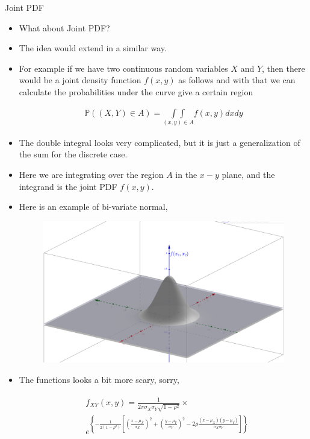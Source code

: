 \documentclass[8pt, usepdftitle=false]{beamer}
\begin{document}
\begin{frame}[allowframebreaks]{Joint PDF}
\begin{itemize}
	\item What about Joint PDF?

	\item The idea would extend in a similar way.

	\item For example if we have two continuous random variables $X$ and $Y$, then there would be a joint density function $f(x, y)$ as follows and with that we can calculate the probabilities under the curve give a certain region

	\begin{align*}
	\mathbb{P}((X, Y) \in A)={\int \int}\limits_{(x, y) \in A} f(x, y) d x d y
	\end{align*}

	\item The double integral looks very complicated, but it is just a generalization of the sum for the discrete case. 

	\item Here we are integrating over the region $A$ in the $x-y$ plane, and the integrand is the joint PDF $f(x, y)$. 

	\item Here is an example of bi-variate normal, 

	\begin{figure}
		\includegraphics[scale = .2]{Images/MVnorm.png}
	\end{figure}

	\item The functions looks a bit more scary, sorry,

	\begin{align*}
		\begin{aligned}
& f_{X Y}(x, y)=\frac{1}{2 \pi \sigma_X \sigma_Y \sqrt{1-\rho^2}} \times  \\
& e^{ \left\{-\frac{1}{2\left(1-\rho^2\right)}\left[\left(\frac{x-\mu_X}{\sigma_X}\right)^2+\left(\frac{y-\mu_Y}{\sigma_Y}\right)^2-2 \rho \frac{\left(x-\mu_X\right)\left(y-\mu_Y\right)}{\sigma_X \sigma_Y}\right]\right\}}
\end{aligned}
	\end{align*}


\end{itemize}
\end{frame}
\end{document}
